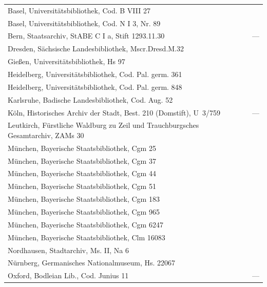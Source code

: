 \noindent
\begin{tabularx}{\linewidth}{@{} >{\raggedright\arraybackslash}X l @{}}
Basel, Universitätsbibliothek, Cod. B VIII 27
	& \autocite[2776]{hsc} \\
Basel, Universitätsbibliothek, Cod. N I 3, Nr. 89
	& \autocite[1158]{hsc} \\
Bern, Staatsarchiv, StABE C I a, Stift 1293.11.30
	& --- \\
Dresden, Sächsische Landesbibliothek, Mscr.Dresd.M.32
	& \autocite[7549]{hsc} \\
Gießen, Universitätsbibliothek, Hs 97
	& \autocite[1102]{hsc} \\
Heidelberg, Universitätsbibliothek, Cod. Pal. germ. 361
	& \autocite[1181]{hsc} \\
Heidelberg, Universitätsbibliothek, Cod. Pal. germ. 848
	& \autocite[4957]{hsc} \\
Karlsruhe, Badische Landesbibliothek, Cod. Aug. 52
	& \autocite[8470]{hsc} \\
Köln, Historisches Archiv der Stadt, Best. 210 (Domstift), U~3/759
	& ---%
	\\
Leutkirch, Fürstliche Waldburg zu Zeil und Trauch\-burg\-sches
	Gesamt\-archiv, ZAMs 30
	& \autocite[8471]{hsc} \\
München, Bayerische Staatsbibliothek, Cgm 25
	& \autocite[8827]{hsc} \\
München, Bayerische Staatsbibliothek, Cgm 37
	& \autocite[2119]{hsc} \\
München, Bayerische Staatsbibliothek, Cgm 44
	& \autocite[1307]{hsc} \\
München, Bayerische Staatsbibliothek, Cgm 51
	& \autocite[1286]{hsc} \\
München, Bayerische Staatsbibliothek, Cgm 183
	& \autocite[9715]{hsc} \\
München, Bayerische Staatsbibliothek, Cgm 965
	& \autocite[8472]{hsc} \\
München, Bayerische Staatsbibliothek, Cgm 6247
	& \autocite[1450]{hsc} \\
München, Bayerische Staatsbibliothek, Clm 16083
	& \autocite[19293]{hsc} \\
Nordhausen, Stadtarchiv, Ms. II, Na 6
	& \autocite[1379]{hsc} \\
Nürnberg, Germanisches Nationalmuseum, Hs. 22067
	& \autocite[1189]{hsc} \\
Oxford, Bodleian Lib., Cod. Junius 11
	& ---%
	\\
\end{tabularx}


